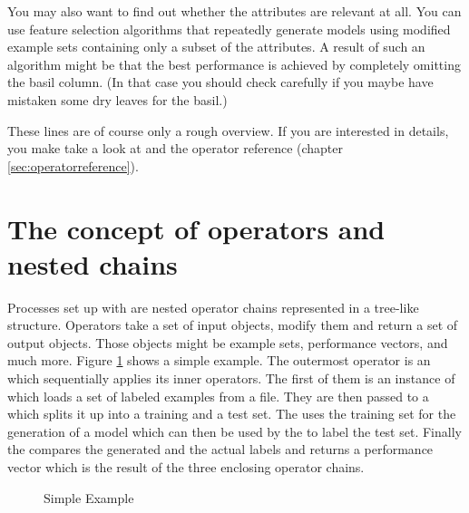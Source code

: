 You may also want to find out whether the attributes are relevant at
all. You can use feature selection algorithms that repeatedly generate
models using modified example sets containing only a subset of the
attributes. A result of such an algorithm might be that the best
performance is achieved by completely omitting the basil column. (In that case you
should check carefully if you maybe have mistaken some dry leaves for
the basil.)

These lines are of course only a rough overview. If you are interested
in details, you make take a look at \cite{Mitchell/97b} and the operator reference
(chapter \ref{sec:operatorreference}).





\section{The concept of operators and nested chains}

Processes set up with \rapidminer are nested operator chains represented in
a tree-like structure. Operators take a set of input objects, modify
them and return a set of output objects. Those objects might be
example sets, performance vectors, and much more. Figure \ref{xval}
shows a simple example. The outermost operator is an
 which sequentially applies its inner operators. The
first of them is an instance of  which loads a set
of labeled examples from a file. They are then passed to a
 which splits it up into a training and a
test set. The  uses the training set for the generation
of a model which can then be used by the  to label the
test set. Finally the  compares the generated
and the actual labels and returns a performance vector which is the
result of the three enclosing operator chains.

\begin{figure}[htp]
  \begin{center}
  \end{center}
  \caption{Simple Example}
  \label{xval}
\end{figure}

